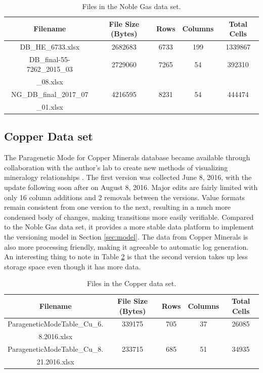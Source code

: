 \begin{table}
	\caption{Files in the Noble Gas data set.}
	\label{noble_gas_file_table}
	\centering
	\begin{tabular}{|c|c|c|c|c|}
		\hline
		Filename & File Size (Bytes) & Rows & Columns &	Total Cells \\ \hline
		DB\_HE\_6733.xlsx &	2682683 &	6733 &	199 &	1339867 \\
		DB\_final-55-7262\_2015\_03 &	2729060 &	7265 &	54 &	392310 \\
		\_08.xlsx&&&&\\
		NG\_DB\_final\_2017\_07 &	4216595 &	8231 &	54 &	444474 \\
		\_01.xlsx&&&&\\
		\hline
	\end{tabular}
\end{table}

\subsection{Copper Data set}

The Paragenetic Mode for Copper Minerals database became available through collaboration with the author's lab to create new methods of visualizing mineralogy relationships \cite{Morrison2016}.
The first version was collected June 8, 2016, with the update following soon after on August 8, 2016.
Major edits are fairly limited with only 16 column additions and 2 removals between the versions.
Value formats remain consistent from one version to the next, resulting in a much more condensed body of changes, making transitions more easily verifiable.
Compared to the Noble Gas data set, it provides a more stable data platform to implement the versioning model in Section \ref{sec:model}.
The data from Copper Minerals is also more processing friendly, making it agreeable to automatic \gls{log} generation.
An interesting thing to note in Table \ref{copper_file_table} is that the second version takes up less storage space even though it has more data.

\begin{table}
	\caption{Files in the Copper data set.}
	\label{copper_file_table}
	\centering
	\begin{tabular}{|c|c|c|c|c|}
		\hline
		Filename & File Size (Bytes) & Rows & Columns &	Total Cells \\ \hline
		ParageneticModeTable\_Cu\_6. &	339175 & 705 &	37 &	26085\\
		8.2016.xlsx&&&&\\
		ParageneticModeTable\_Cu\_8. & 233715 & 685 & 51 & 34935\\
		21.2016.xlsx&&&&\\
		\hline
	\end{tabular}
\end{table}

